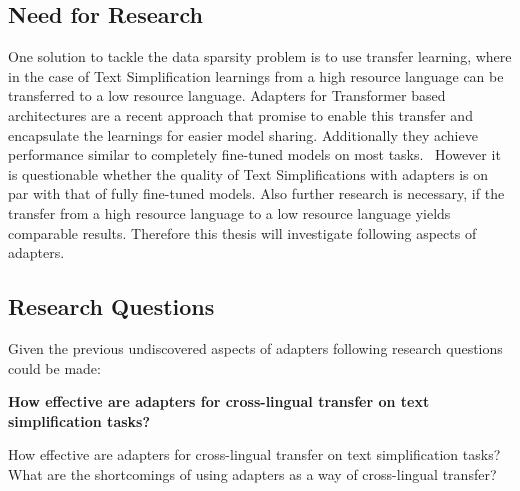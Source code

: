 \subsection{Need for Research}
One solution to tackle the data sparsity problem is to use transfer learning, where in the case of Text Simplification learnings from a high
resource language can be transferred to a low resource language. Adapters for Transformer based architectures are a recent approach
that promise to enable this transfer and encapsulate the learnings for easier model sharing.
Additionally they achieve performance similar to completely fine-tuned models on most tasks.~\cite{Pfeiffer2020}
However it is questionable whether the quality of Text Simplifications with adapters is on par with that of fully fine-tuned models.
Also further research is necessary, if the transfer from a high resource language to a low resource language yields comparable results.
Therefore this thesis will investigate following aspects of adapters.

\subsection{Research Questions}
Given the previous undiscovered aspects of adapters following research questions could be made:

\textbf{How effective are adapters for cross-lingual transfer on text simplification tasks?}


\begin{description}
    \item[How effective are adapters for cross-lingual transfer on text simplification tasks?]
    \item[What are the shortcomings of using adapters as a way of cross-lingual transfer?]
\end{description}

